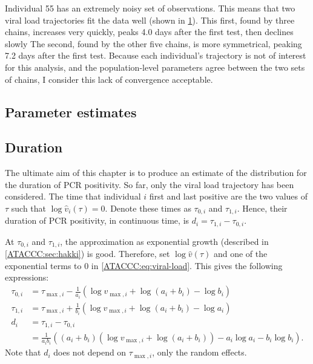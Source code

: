 \documentclass[thesis.tex]{subfiles}
\begin{document}
Individual 55 has an extremely noisy set of observations.
This means that two viral load trajectories fit the data well (shown in \cref{ATACCC:fig:individual-55}).
This first, found by three chains, increases very quickly, peaks 4.0 days after the first test, then declines slowly
The second, found by the other five chains, is more symmetrical, peaking 7.2 days after the first test.
Because each individual's trajectory is not of interest for this analysis, and the population-level parameters agree between the two sets of chains, I consider this lack of convergence acceptable.
\begin{figure}
  \caption{\label{ATACCC:fig:individual-55}}
\end{figure}


\subsection{Parameter estimates} \label{ATACCC:sec:estimates}

\subsection{Duration} \label{ATACCC:sec:duration}

The ultimate aim of this chapter is to produce an estimate of the distribution for the duration of PCR positivity.
So far, only the viral load trajectory has been considered.
The time that individual $i$ first and last positive are the two values of $\tau$ such that $\log \hat{v}_i(\tau) = 0$.
Denote these times as $\tau_{0,i}$ and $\tau_{1,i}$.
Hence, their duration of PCR positivity, in continuous time, is $d_i = \tau_{1,i} - \tau_{0,i}$.

At $\tau_{0,i}$ and $\tau_{1,i}$, the approximation as exponential growth (described in \cref{ATACCC:sec:hakki}) is good.
Therefore, set $\log \hat{v}(\tau)$ and one of the exponential terms to 0 in \cref{ATACCC:eq:viral-load}.
This gives the following expressions:
$$
\begin{aligned}
\tau_{0,i}
&= \tau_{\max,i} - \frac{1}{a_i} \left(\log v_{\max,i} + \log(a_i + b_i) - \log b_i \right) \\
\tau_{1,i}
&= \tau_{\max,i} + \frac{1}{b_i} \left(\log v_{\max,i} + \log(a_i + b_i) - \log a_i \right) \\
d_i
&= \tau_{1,i} - \tau_{0,i}  \\
&= \frac{1}{a_i b_i} \left( (a_i + b_i) (\log v_{\max,i} + \log(a_i + b_i)) - a_i \log a_i - b_i \log b_i \right).
\end{aligned}
$$
Note that $d_i$ does not depend on $\tau_{\max,i}$, only the random effects.
\end{document}
